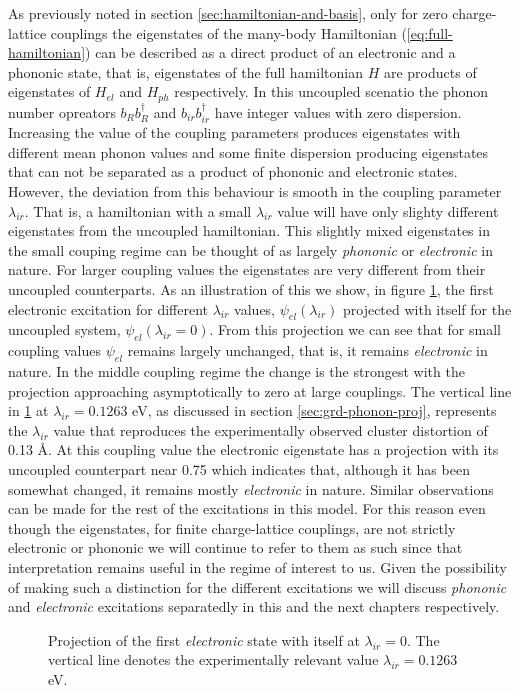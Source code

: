 As previously noted in section \ref{sec:hamiltonian-and-basis}, only for zero charge-lattice couplings the eigenstates of the many-body Hamiltonian (\ref{eq:full-hamiltonian}) can be described as a direct product of an electronic and a phononic state, that is, eigenstates of the full hamiltonian $H$ are products of eigenstates of $H_{el}$ and $H_{ph}$ respectively.
In this uncoupled scenatio the phonon number opreators $b_Rb^\dagger_R$ and $b_{ir}b^\dagger_{ir}$ have integer values with zero dispersion.
Increasing the value of the coupling parameters produces eigenstates with different mean phonon values and some finite dispersion producing eigenstates that can not be separated as a product of phononic and electronic states.
However, the deviation from this behaviour is smooth in the coupling parameter $\lambda_{ir}$.
That is, a hamiltonian with a small $\lambda_{ir}$ value will have only slighty different eigenstates from the uncoupled hamiltonian.
This slightly mixed eigenstates in the small couping regime can be thought of as largely \textit{phononic} or \textit{electronic} in nature.
For larger coupling values the eigenstates are very different from their uncoupled counterparts.
As an illustration of this we show, in figure \ref{fig:electr-proj}, the first electronic excitation for different $\lambda_{ir}$ values, $\psi_{el}(\lambda_{ir})$ projected with itself for the uncoupled system, $\psi_{el}(\lambda_{ir}=0)$.
From this projection we can see that for small coupling values $\psi_{el}$ remains largely unchanged, that is, it remains \textit{electronic} in nature.
In the middle coupling regime the change is the strongest with the projection approaching asymptotically to zero at large couplings.
The vertical line in \ref{fig:electr-proj} at $\lambda_{ir}=0.1263$ eV, as discussed in section \ref{sec:grd-phonon-proj}, represents the $\lambda_{ir}$ value that reproduces the experimentally observed cluster distortion of 0.13 \AA.
At this coupling value the electronic eigenstate has a projection with its uncoupled counterpart near 0.75 which indicates that, although it has been somewhat changed, it remains mostly \textit{electronic} in nature.
Similar observations can be made for the rest of the excitations in this model.
For this reason even though the eigenstates, for finite charge-lattice couplings, are not strictly electronic or phononic we will continue to refer to them as such since that interpretation remains useful in the regime of interest to us.
Given the possibility of making such a distinction for the different excitations we will discuss \textit{phononic} and \textit{electronic} excitations separatedly in this and the next chapters respectively. 
%
\begin{figure}[ht]
  \centering
  
  \caption[Projection of the first \textit{electronic} state with itself at $\lambda_{ir}=0$.]
  {Projection of the first \textit{electronic} state with itself at $\lambda_{ir}=0$.
    The vertical line denotes the experimentally relevant value $\lambda_{ir}=0.1263$ eV.}
  \label{fig:electr-proj}
\end{figure}


